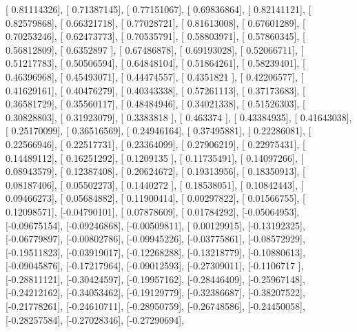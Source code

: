 \documentclass{article}
\begin{document}
       [ 0.81114326],
       [ 0.71387145],
       [ 0.77151067],
       [ 0.69836864],
       [ 0.82141121],
       [ 0.82579868],
       [ 0.66321718],
       [ 0.77028721],
       [ 0.81613008],
       [ 0.67601289],
       [ 0.70253246],
       [ 0.62473773],
       [ 0.70535791],
       [ 0.58803971],
       [ 0.57860345],
       [ 0.56812809],
       [ 0.6352897 ],
       [ 0.67486878],
       [ 0.69193028],
       [ 0.52066711],
       [ 0.51217783],
       [ 0.50506594],
       [ 0.64848104],
       [ 0.51864261],
       [ 0.58239401],
       [ 0.46396968],
       [ 0.45493071],
       [ 0.44474557],
       [ 0.4351821 ],
       [ 0.42206577],
       [ 0.41629161],
       [ 0.40476279],
       [ 0.40343338],
       [ 0.57261113],
       [ 0.37173683],
       [ 0.36581729],
       [ 0.35560117],
       [ 0.48484946],
       [ 0.34021338],
       [ 0.51526303],
       [ 0.30828803],
       [ 0.31923079],
       [ 0.3383818 ],
       [ 0.463374  ],
       [ 0.43384935],
       [ 0.41643038],
       [ 0.25170099],
       [ 0.36516569],
       [ 0.24946164],
       [ 0.37495881],
       [ 0.22286081],
       [ 0.22566946],
       [ 0.22517731],
       [ 0.23364099],
       [ 0.27906219],
       [ 0.22975431],
       [ 0.14489112],
       [ 0.16251292],
       [ 0.1209135 ],
       [ 0.11735491],
       [ 0.14097266],
       [ 0.08943579],
       [ 0.12387408],
       [ 0.20624672],
       [ 0.19313956],
       [ 0.18350913],
       [ 0.08187406],
       [ 0.05502273],
       [ 0.1440272 ],
       [ 0.18538051],
       [ 0.10842443],
       [ 0.09466273],
       [ 0.05684882],
       [ 0.11900414],
       [ 0.00297822],
       [ 0.01566755],
       [ 0.12098571],
       [-0.04790101],
       [ 0.07878609],
       [ 0.01784292],
       [-0.05064953],
       [-0.09675154],
       [-0.09246868],
       [-0.00509811],
       [ 0.00129915],
       [-0.13192325],
       [-0.06779897],
       [-0.00802786],
       [-0.09945226],
       [-0.03775861],
       [-0.08572929],
       [-0.19511823],
       [-0.03919017],
       [-0.12268288],
       [-0.13218779],
       [-0.10880613],
       [-0.09045876],
       [-0.17217964],
       [-0.09012593],
       [-0.27309011],
       [-0.1106717 ],
       [-0.28811121],
       [-0.30424597],
       [-0.19957162],
       [-0.28446409],
       [-0.25967148],
       [-0.24212162],
       [-0.34053462],
       [-0.19129779],
       [-0.32386687],
       [-0.38207522],
       [-0.21778261],
       [-0.24610711],
       [-0.28950759],
       [-0.26748586],
       [-0.24450058],
       [-0.28257584],
       [-0.27028346],
       [-0.27290694],
\end{document}
